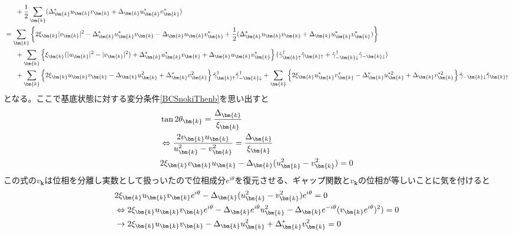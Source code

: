 \documentclass[dvipdfmx, 11pt, a4paper]{jsarticle}
\numberwithin{equation}{section}
\theoremstyle{definition}
\begin{document}
\begin{derivationBox}
\begin{align}
            &\ \ \ \ \ + \frac{1}{2}\sum_{\bm{k}}(\Delta_{\bm{k}}^* u_{\bm{k}}v_{\bm{k}} + \Delta_{\bm{k}} u_{\bm{k}}^*v_{\bm{k}}^* ) \notag \\
            &=\sum_{\bm{k}} \left\{ 2\xi_{\bm{k}} |v_{\bm{k}}|^2 - \Delta_{\bm{k}}^*  u_{\bm{k}}^* v_{\bm{k}} -\Delta_{\bm{k}}  u_{\bm{k}}v_{\bm{k}}^* + \frac{1}{2}(\Delta_{\bm{k}}^* u_{\bm{k}}v_{\bm{k}} + \Delta_{\bm{k}} u_{\bm{k}}^*v_{\bm{k}}^* ) \right\} \notag \\
            &\ \ \ \ \ + \sum_{\bm{k}} \left\{ \xi_{\bm{k}}(|u_{\bm{k}}|^2 - |v_{\bm{k}}|^2) +\Delta_{\bm{k}}^*  u_{\bm{k}}^* v_{\bm{k}} +\Delta_{\bm{k}}  u_{\bm{k}} v_{\bm{k}}^* \right\}(\hat{\gamma}_{\bm{k}\uparrow}^\dagger \hat{\gamma}_{\bm{k}\uparrow} + \hat{\gamma}_{-\bm{k}\downarrow}^\dagger\hat{\gamma}_{-\bm{k}\downarrow})  \notag \\
            &\ \ \ \ \ +\sum_{\bm{k}} \left\{ 2\xi_{\bm{k}}u_{\bm{k}}v_{\bm{k}} -\Delta_{\bm{k}} u_{\bm{k}}^2 + \Delta_{\bm{k}}^* v_{\bm{k}}^2 \right\} \hat{\gamma}_{\bm{k}\uparrow}^\dagger  \hat{\gamma}_{-\bm{k}\downarrow}^\dagger + \sum_{\bm{k}} \left\{ 2\xi_{\bm{k}}u_{\bm{k}}^* v_{\bm{k}}^* - \Delta_{\bm{k}}^* u_{\bm{k}}^{*2}  + \Delta_{\bm{k}} v_{\bm{k}}^{*2}  \right\} \hat{\gamma}_{-\bm{k}\downarrow}\hat{\gamma}_{\bm{k}\uparrow}
        \end{align}
        となる。ここで基底状態に対する変分条件\eqref{BCSnokiThenb}を思い出すと
        \begin{align}
            &\tan 2\theta_{\bm{k}} = \frac{\Delta_{\bm{k}}}{\xi_{\bm{k}}} \notag \\
            &\Leftrightarrow \frac{2v_{\bm{k}}u_{\bm{k}}}{u_{\bm{k}}^2 - v_{\bm{k}}^2} = \frac{\Delta_{\bm{k}}}{\xi_{\bm{k}}} \notag \\
            &2\xi_{\bm{k}}v_{\bm{k}}u_{\bm{k}} - \Delta_{\bm{k}}(u_{\bm{k}}^2 - v_{\bm{k}}^2) = 0
        \end{align}
        この式の$v_{\bm{k}}$は位相を分離し実数として扱っいたので位相成分$e^{i\theta}$を復元させる、ギャップ関数と$v_{\bm{k}}$の位相が等しいことに気を付けると
        \begin{align}
            &2\xi_{\bm{k}}u_{\bm{k}}v_{\bm{k}}e^{i\theta} - \Delta_{\bm{k}}(u_{\bm{k}}^2 - v_{\bm{k}}^2)e^{i\theta} = 0 \notag \\
            &\Leftrightarrow 2\xi_{\bm{k}}u_{\bm{k}}v_{\bm{k}}e^{i\theta} - \Delta_{\bm{k}}e^{i\theta}u_{\bm{k}}^2 - \Delta_{\bm{k}}e^{-i\theta}(v_{\bm{k}}e^{i\theta})^2) = 0 \notag \\
            &\rightarrow 2\xi_{\bm{k}}u_{\bm{k}}v_{\bm{k}} - \Delta_{\bm{k}}u_{\bm{k}}^2 +\Delta_{\bm{k}}^* v_{\bm{k}}^2 = 0 

\end{align}
\end{derivationBox}
\end{document}
